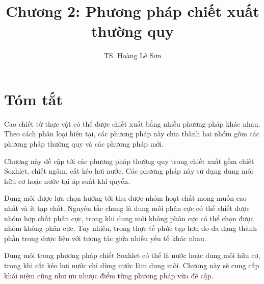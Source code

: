 \documentclass[
  twocolumn,
  landscape]{report}
\title{Chương 2: Phương pháp chiết xuất thường quy}
\author{TS. Hoàng Lê Sơn}
\date{}
\renewcommand*\contentsname{Table of contents}
\newcommand\contentsname{Table of contents}
\begin{document}
\maketitle

\renewcommand*\contentsname{Table of contents}
{
\hypersetup{linkcolor=}
\setcounter{tocdepth}{2}
\tableofcontents
}
\listoffigures
\listoftables

\section{Tóm tắt}\label{tuxf3m-tux1eaft}

Cao chiết từ thực vật có thể được chiết xuất bằng nhiều phương pháp khác
nhau. Theo cách phân loại hiện tại, các phương pháp này chia thành hai
nhóm gồm các phương pháp thường quy và các phương pháp mới.

Chương này đề cập tới các phương pháp thường quy trong chiết xuất gồm
chiết Soxhlet, chiết ngâm, cất kéo hơi nước. Các phương pháp này sử dụng
dung môi hữu cơ hoặc nước tại áp suất khí quyển.

Dung môi được lựa chọn hướng tới thu được nhóm hoạt chất mong muốn cao
nhất và ít tạp chất. Nguyên tắc chung là dung môi phân cực có thể chiết
được nhóm hợp chất phân cực, trong khi dung môi không phân cực có thể
chọn được nhóm không phân cực. Tuy nhiên, trong thực tế phức tạp hơn do
đa dạng thành phần trong dược liệu với tương tác giữa nhiều yếu tố khác
nhau.

Dung môi trong phương pháp chiết Soxhlet có thể là nước hoặc dung môi
hữu cơ, trong khi cất kéo hơi nước chỉ dùng nước làm dung môi. Chương
này sẽ cung cấp khái niệm cũng như ưu nhược điểm từng phương pháp vừa đề
cập.
\end{document}
